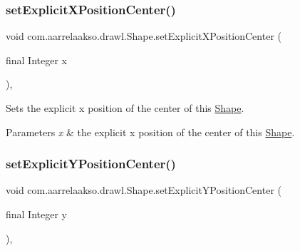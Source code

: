 \subsubsection{\texorpdfstring{set\+Explicit\+X\+Position\+Center()}{setExplicitXPositionCenter()}\hspace{0.1cm}{\footnotesize\ttfamily [2/2]}}
{\footnotesize\ttfamily void com.\+aarrelaakso.\+drawl.\+Shape.\+set\+Explicit\+X\+Position\+Center (\begin{DoxyParamCaption}\item[{final Integer}]{x }\end{DoxyParamCaption})\hspace{0.3cm}{\ttfamily [protected]}, {\ttfamily [inherited]}}



Sets the explicit x position of the center of this \hyperlink{classcom_1_1aarrelaakso_1_1drawl_1_1_shape}{Shape}. 


\begin{DoxyParams}{Parameters}
{\em x} & the explicit x position of the center of this \hyperlink{classcom_1_1aarrelaakso_1_1drawl_1_1_shape}{Shape}. \\
\hline
\end{DoxyParams}
\mbox{\label{classcom_1_1aarrelaakso_1_1drawl_1_1_shape_a93e9e1bdd05f111661660e9de621cd12}} 
\subsubsection{\texorpdfstring{set\+Explicit\+Y\+Position\+Center()}{setExplicitYPositionCenter()}\hspace{0.1cm}{\footnotesize\ttfamily [1/2]}}
{\footnotesize\ttfamily void com.\+aarrelaakso.\+drawl.\+Shape.\+set\+Explicit\+Y\+Position\+Center (\begin{DoxyParamCaption}\item[{final Integer}]{y }\end{DoxyParamCaption})\hspace{0.3cm}{\ttfamily [protected]}, {\ttfamily [inherited]}}



